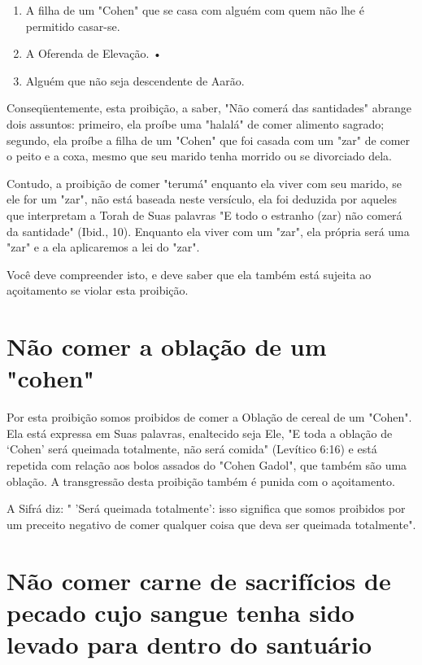 \begin{itemize}
\begin{enumrate}
\begin{itemize}
\begin{itemize}
\begin{itemize}
\begin{enumerate}
\def\labelenumi{\arabic{enumi}.}
\setcounter{enumi}{301}
\item
 
 A filha de um "Cohen" que se casa com alguém com quem não lhe é
 permitido casar-se.
 
\item
 
 A Oferenda de Elevação. •
 
\item
 
 Alguém que não seja descendente de Aarão.
 
\end{enumerate}



Conseqüentemente, esta proibição, a saber, "Não comerá das santi­dades"
abrange dois assuntos: primeiro, ela proíbe uma "halalá" de comer
ali­mento sagrado; segundo, ela proíbe a filha de um "Cohen" que foi
casada com um "zar" de comer o peito e a coxa, mesmo que seu marido
tenha morrido ou se divorciado dela.

Contudo, a proibição de comer "terumá" enquanto ela viver com seu
marido, se ele for um "zar", não está baseada neste versículo, ela foi
dedu­zida por aqueles que interpretam a Torah de Suas palavras "E todo o
estranho (zar) não comerá da santidade" (Ibid., 10). Enquanto ela viver
com um "zar", ela própria será uma "zar" e a ela aplicaremos a lei do
"zar".

Você deve compreender isto, e deve saber que ela também está su­jeita ao
açoitamento se violar esta proibição.

\section{Não comer a oblação de um "cohen"}

Por esta proibição somos proibidos de comer a Oblação de cereal de um
"Cohen". Ela está expressa em Suas palavras, enaltecido seja Ele, "E
to­da a oblação de `Cohen' será queimada totalmente, não será comida"
(Levítico 6:16) e está repetida com relação aos bolos assados do "Cohen
Gadol", que também são uma oblação. A transgressão desta proibição
também é punida com o açoitamento.

A Sifrá diz: " 'Será queimada totalmente': isso significa que somos
proibidos por um preceito negativo de comer qualquer coisa que deva ser
quei­mada totalmente".

\section{Não comer carne de sacrifícios de pecado cujo sangue tenha sido
levado para dentro do santuário}


\end{itemize}
\end{itemize}
\end{itemize}
\end{enumrate}
\end{itemize}
